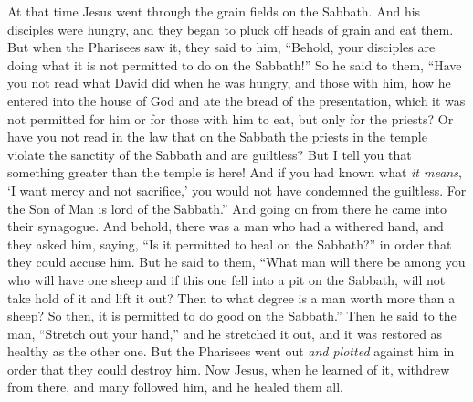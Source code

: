 \begin{biblechapter} %
 At that time Jesus went through the grain fields on the Sabbath. And his disciples were hungry, and they began to pluck off heads of grain and eat them.
\verse But when the Pharisees saw it, they said to him, “Behold, your disciples are doing what it is not permitted to do on the Sabbath!”
\verse So he said to them, “Have you not read what David did when he was hungry, and those with him,
\verse how he entered into the house of God and ate the bread of the presentation, which it was not permitted for him or for those with him to eat, but only for the priests?
\verse Or have you not read in the law that on the Sabbath the priests in the temple violate the sanctity of the Sabbath and are guiltless?
\verse But I tell you that something greater than the temple is here!
\verse And if you had known what \textit{it means}, ‘I want mercy and not sacrifice,’ you would not have condemned the guiltless.
\verse For the Son of Man is lord of the Sabbath.”
 And going on from there he came into their synagogue.
\verse And behold, there was a man who had a withered hand, and they asked him, saying, “Is it permitted to heal on the Sabbath?” in order that they could accuse him.
\verse But he said to them, “What man will there be among you who will have one sheep and if this one fell into a pit on the Sabbath, will not take hold of it and lift it out?
\verse Then to what degree is a man worth more than a sheep? So then, it is permitted to do good on the Sabbath.”
\verse Then he said to the man, “Stretch out your hand,” and he stretched it out, and it was restored as healthy as the other one.
\verse But the Pharisees went out \textit{and plotted} against him in order that they could destroy him.
 Now Jesus, when he learned of it, withdrew from there, and many followed him, and he healed them all.

\end{biblechapter}
